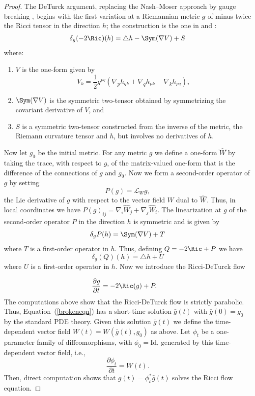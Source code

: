 \begin{proof}
\sketch The DeTurck argument, replacing the Nash--Moser approach
\cite{HamiltonIFTNM} by gauge breaking \cite{DeTurck}, begins with the first
variation at a Riemannian metric $g$ of minus twice the Ricci tensor in the direction $h$;
the construction is the one in \cite{DeTurck} and \cite{ChowKnopf}:
\begin{align*}
\delta_g(-2\Ric)(h)=\triangle h-\Sym(\nabla V)+S
\end{align*}
where:
\begin{enumerate}
\item $V$ is the one-form given by
$$V_k=\frac{1}{2}g^{pq}(\nabla_ph_{qk}+\nabla_qh_{pk}-\nabla_kh_{pq}),$$
\item $\Sym(\nabla V)$ is the symmetric two-tensor obtained by
symmetrizing the covariant derivative of
$V$, and
\item  $S$ is a symmetric two-tensor constructed from the inverse of the metric,
the Riemann curvature tensor and $h$, but involves no derivatives of $h$.
\end{enumerate}

Now let $g_0$ be the initial metric. For any metric $g$ we define a one-form
$\hat W$ by taking the trace, with respect to $g$, of the matrix-valued
one-form that is the difference of the connections of $g$ and $g_0$. Now we
form a second-order operator of $g$ by setting
$$P(g)={\mathcal L}_Wg,$$
the Lie derivative of $g$ with respect to the vector field $W$ dual to $\hat
W$. Thus, in local coordinates we have
$P(g)_{ij}=\nabla_i\hat W_j+\nabla_j\hat W_i$.
The linearization at $g$ of the second-order operator $P$ in the direction
$h$ is symmetric and is given by
$$\delta_gP(h)=\Sym(\nabla V)+T$$
where $T$ is a first-order operator in $h$.
Thus, defining $Q=-2\Ric+P$ we have
$$\delta_g(Q)(h)=\triangle h+U$$
where $U$ is a first-order operator in $h$.
Now we introduce the Ricci-DeTurck  flow

\begin{align}\label{brokeneqn}
\frac{\partial g}{\partial t}&=-2\Ric(g)+P.
\end{align}
The computations above show that the Ricci-DeTurck flow is  strictly parabolic.
 Thus, Equation~(\ref{brokeneqn})  has a
short-time solution $\bar g(t)$ with $\bar g(0)=g_0$ by the standard PDE theory.
Given this solution $\bar g(t)$ we
define the time-dependent vector field $W(t)=W(\bar g(t),g_0)$ as above.
 Let $\phi_t$ be a one-parameter family of diffeomorphisms, with $\phi_0=\mathrm{Id}$,
generated by this time-dependent vector field, i.e.,
$$\frac{\partial\phi_t}{\partial t}=W(t).$$
Then, direct computation shows that $g(t)=\phi_t^*\bar g(t)$ solves the Ricci flow equation.
\end{proof}



